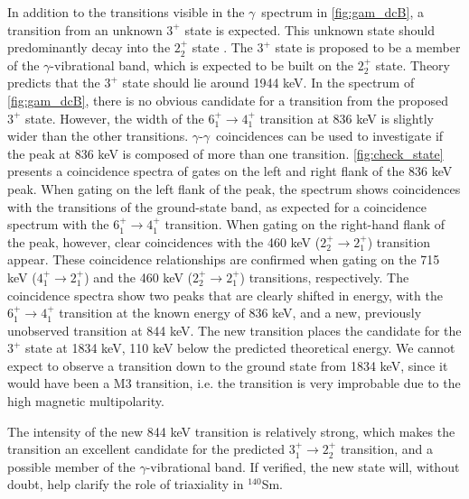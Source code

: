 \documentclass[twoside,english]{uiofysmaster/uiofysmaster}
\newcommand{\Sm}{$^{140}$Sm} %
\newcommand{\ga}{$\gamma$}
\let\orgautoref\autoref
\renewcommand{\autoref}
        {%
		 \def\sectionautorefname{Section}%
		 \def\subsectionautorefname{Section}%
		 \def\subsubsectionautorefname{Section}%
		 \def\chapterautorefname{Chapter}%
          \orgautoref}
\begin{document}
In addition to the transitions visible in the \ga\ spectrum in \autoref{fig:gam_dcB}, a transition from an unknown $3^+$ state is expected.
This unknown state should predominantly decay into the $2_2^+$ state \cite{Klintefjord2016, Samorajczyk2015}.
The $3^+$ state is proposed to be a member of the \ga-vibrational band, which is expected to be built on the $2_2^+$ state.
Theory predicts that the $3^+$ state should lie around 1944 keV.
In the spectrum of \autoref{fig:gam_dcB}, there is no obvious candidate for a transition from the proposed $3^+$ state.
However, the width of the $6_1^+ \rightarrow 4_1^+$ transition at 836 keV is slightly wider than the other transitions. 
\ga-\ga\ coincidences can be used to investigate if the peak at 836 keV is composed of more than one transition. 
\autoref{fig:check_state} presents a coincidence spectra of gates on the left and right flank of the 836 keV peak.
When gating on the left flank of the peak, the spectrum shows coincidences with the transitions of the ground-state band, as expected for a coincidence spectrum with the $6_1^+ \rightarrow 4_1^+$ transition. 
When gating on the right-hand flank of the peak, however, clear coincidences with the 460 keV ($2_2^+ \rightarrow 2_1^+$) transition appear. 
These coincidence relationships are confirmed when gating on the 715 keV ($4_1^+ \rightarrow 2_1^+$) and the 460 keV ($2_2^+ \rightarrow 2_1^+$) transitions, respectively. 
The coincidence spectra show two peaks that are clearly shifted in energy, with the $6_1^+ \rightarrow 4_1^+$ transition at the known energy of 836 keV, and a new, previously unobserved transition at 844 keV. 
The new transition places the candidate for the $3^+$ state at 1834 keV, 110 keV below the predicted theoretical energy. 
We cannot expect to observe a transition down to the ground state from 1834 keV, since it would have been a M3 transition, i.e. the transition is very improbable due to the high magnetic multipolarity.

The intensity of the new 844 keV transition is relatively strong, which makes the transition an excellent candidate for the predicted $3_1^+ \rightarrow 2_2^+$ transition, and a possible member of the \ga-vibrational band. If verified, the new state will, without doubt, help clarify the role of triaxiality in \Sm.
\end{document}
